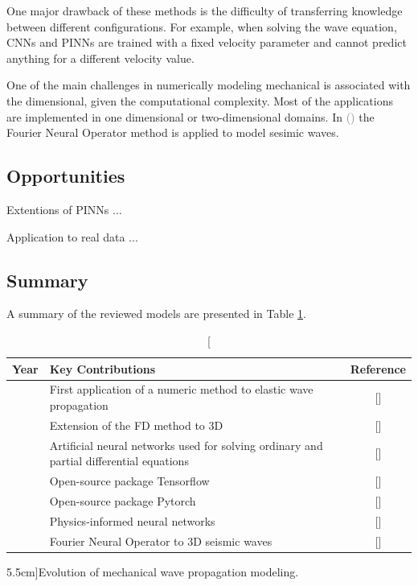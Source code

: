 \documentclass{tufte-handout}
\renewcommand{\citeauthoryear}[2][]{\textcolor{gray}{\citeauthor{#2} (\textcolor{gray}{\citeyear[#1]{#2}})}}
\begin{document}
One major drawback of these methods is the difficulty of transferring knowledge between different configurations. For example, when solving the wave equation, CNNs and PINNs are trained with a fixed velocity parameter and cannot predict anything for a different velocity value.

One of the main challenges in numerically modeling mechanical is associated with the dimensional, given the computational complexity. Most of the applications are implemented in one dimensional or two-dimensional domains. In \citeauthoryear{lehmann_fourier_2023} the Fourier Neural Operator method is applied to model sesimic waves.

\subsection{Opportunities}

Extentions of PINNs ...

Application to real data ...


\subsection{Summary}

A summary of the reviewed models are presented in Table \ref{tab:summary}.

\begin{table}[h]
    \centering
    \label{tab:algorithm-pinns}
    \begin{tabular}{|c|l|c|}
    \hline
    Year & Key Contributions & Reference \\ \hline
    \citeyear{alterman_propagation_1968} &  {First application of a numeric method to elastic wave propagation} & [\citealp{alterman_propagation_1968}]\\ \hline
    \citeyear{frankel_three-dimensional_1992} &  Extension of the FD method to 3D & [\citealp{frankel_three-dimensional_1992}] \\ \hline
    \citeyear{lagaris_artificial_1998} &  Artificial neural networks used for solving ordinary and partial differential equations & [\citealp{lagaris_artificial_1998}]\\ \hline
    \citeyear{abadi_tensorflow_2016} &  Open-source package Tensorflow & [\citealp{abadi_tensorflow_2016}]\\ \hline
    \citeyear{paszke_pytorch_2019} &  Open-source package Pytorch & [\citealp{paszke_pytorch_2019}]\\ \hline
    \citeyear{Raissi2019} &  Physics-informed neural networks & [\citealp{Raissi2019}] \\ \hline
    \citeyear{lehmann_fourier_2023}  & Fourier Neural Operator to 3D seismic waves  & [\citealp{lehmann_fourier_2023}] \\ \hline
    \end{tabular}
    \caption[][5.5cm]{Evolution of mechanical wave propagation modeling.}\label{tab:summary}
\end{table}
\end{document}
